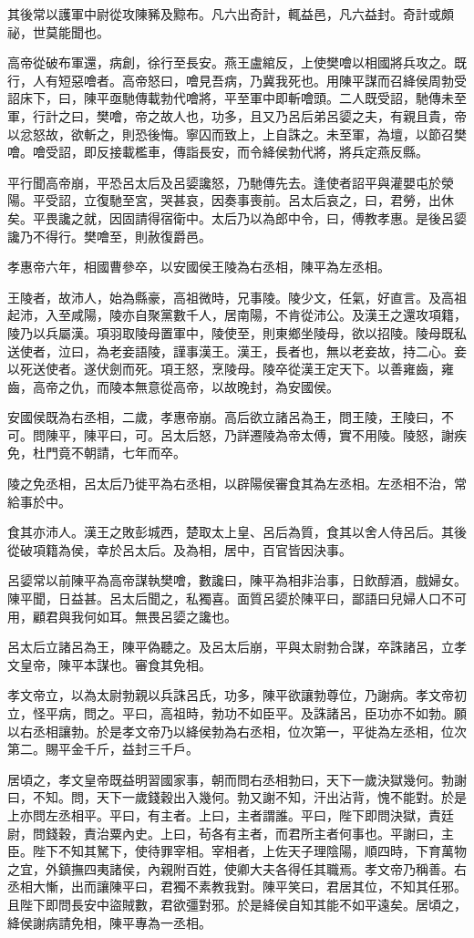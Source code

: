 其後常以護軍中尉從攻陳豨及黥布。凡六出奇計，輒益邑，凡六益封。奇計或頗祕，世莫能聞也。

高帝從破布軍還，病創，徐行至長安。燕王盧綰反，上使樊噲以相國將兵攻之。既行，人有短惡噲者。高帝怒曰，噲見吾病，乃冀我死也。用陳平謀而召絳侯周勃受詔床下，曰，陳平亟馳傳載勃代噲將，平至軍中即斬噲頭。二人既受詔，馳傳未至軍，行計之曰，樊噲，帝之故人也，功多，且又乃呂后弟呂媭之夫，有親且貴，帝以忿怒故，欲斬之，則恐後悔。寧囚而致上，上自誅之。未至軍，為壇，以節召樊噲。噲受詔，即反接載檻車，傳詣長安，而令絳侯勃代將，將兵定燕反縣。

平行聞高帝崩，平恐呂太后及呂媭讒怒，乃馳傳先去。逢使者詔平與灌嬰屯於滎陽。平受詔，立復馳至宮，哭甚哀，因奏事喪前。呂太后哀之，曰，君勞，出休矣。平畏讒之就，因固請得宿衛中。太后乃以為郎中令，曰，傅教孝惠。是後呂媭讒乃不得行。樊噲至，則赦復爵邑。

孝惠帝六年，相國曹參卒，以安國侯王陵為右丞相，陳平為左丞相。

王陵者，故沛人，始為縣豪，高祖微時，兄事陵。陵少文，任氣，好直言。及高祖起沛，入至咸陽，陵亦自聚黨數千人，居南陽，不肯從沛公。及漢王之還攻項籍，陵乃以兵屬漢。項羽取陵母置軍中，陵使至，則東鄉坐陵母，欲以招陵。陵母既私送使者，泣曰，為老妾語陵，謹事漢王。漢王，長者也，無以老妾故，持二心。妾以死送使者。遂伏劍而死。項王怒，烹陵母。陵卒從漢王定天下。以善雍齒，雍齒，高帝之仇，而陵本無意從高帝，以故晚封，為安國侯。

安國侯既為右丞相，二歲，孝惠帝崩。高后欲立諸呂為王，問王陵，王陵曰，不可。問陳平，陳平曰，可。呂太后怒，乃詳遷陵為帝太傅，實不用陵。陵怒，謝疾免，杜門竟不朝請，七年而卒。

陵之免丞相，呂太后乃徙平為右丞相，以辟陽侯審食其為左丞相。左丞相不治，常給事於中。

食其亦沛人。漢王之敗彭城西，楚取太上皇、呂后為質，食其以舍人侍呂后。其後從破項籍為侯，幸於呂太后。及為相，居中，百官皆因決事。

呂媭常以前陳平為高帝謀執樊噲，數讒曰，陳平為相非治事，日飲醇酒，戲婦女。陳平聞，日益甚。呂太后聞之，私獨喜。面質呂媭於陳平曰，鄙語曰兒婦人口不可用，顧君與我何如耳。無畏呂媭之讒也。

呂太后立諸呂為王，陳平偽聽之。及呂太后崩，平與太尉勃合謀，卒誅諸呂，立孝文皇帝，陳平本謀也。審食其免相。

孝文帝立，以為太尉勃親以兵誅呂氏，功多，陳平欲讓勃尊位，乃謝病。孝文帝初立，怪平病，問之。平曰，高祖時，勃功不如臣平。及誅諸呂，臣功亦不如勃。願以右丞相讓勃。於是孝文帝乃以絳侯勃為右丞相，位次第一，平徙為左丞相，位次第二。賜平金千斤，益封三千戶。

居頃之，孝文皇帝既益明習國家事，朝而問右丞相勃曰，天下一歲決獄幾何。勃謝曰，不知。問，天下一歲錢穀出入幾何。勃又謝不知，汗出沾背，愧不能對。於是上亦問左丞相平。平曰，有主者。上曰，主者謂誰。平曰，陛下即問決獄，責廷尉，問錢穀，責治粟內史。上曰，茍各有主者，而君所主者何事也。平謝曰，主臣。陛下不知其駑下，使待罪宰相。宰相者，上佐天子理陰陽，順四時，下育萬物之宜，外鎮撫四夷諸侯，內親附百姓，使卿大夫各得任其職焉。孝文帝乃稱善。右丞相大慚，出而讓陳平曰，君獨不素教我對。陳平笑曰，君居其位，不知其任邪。且陛下即問長安中盜賊數，君欲彊對邪。於是絳侯自知其能不如平遠矣。居頃之，絳侯謝病請免相，陳平專為一丞相。

